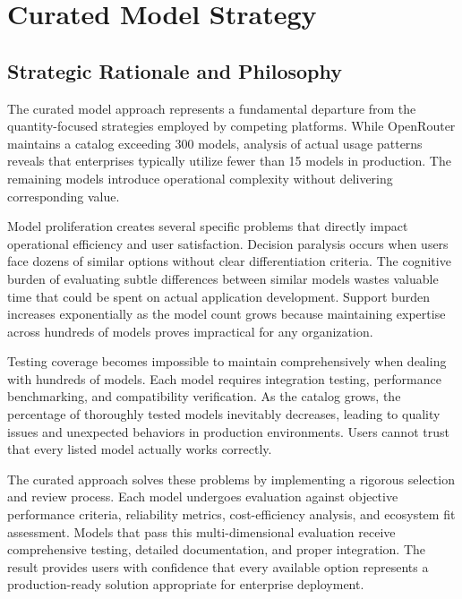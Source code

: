 \documentclass[12pt,a4paper,twoside]{report}
\begin{document}

\chapter{Curated Model Strategy}

\section{Strategic Rationale and Philosophy}

The curated model approach represents a fundamental departure from the quantity-focused strategies employed by competing platforms. While OpenRouter maintains a catalog exceeding 300 models, analysis of actual usage patterns reveals that enterprises typically utilize fewer than 15 models in production. The remaining models introduce operational complexity without delivering corresponding value.

Model proliferation creates several specific problems that directly impact operational efficiency and user satisfaction. Decision paralysis occurs when users face dozens of similar options without clear differentiation criteria. The cognitive burden of evaluating subtle differences between similar models wastes valuable time that could be spent on actual application development. Support burden increases exponentially as the model count grows because maintaining expertise across hundreds of models proves impractical for any organization.

Testing coverage becomes impossible to maintain comprehensively when dealing with hundreds of models. Each model requires integration testing, performance benchmarking, and compatibility verification. As the catalog grows, the percentage of thoroughly tested models inevitably decreases, leading to quality issues and unexpected behaviors in production environments. Users cannot trust that every listed model actually works correctly.

The curated approach solves these problems by implementing a rigorous selection and review process. Each model undergoes evaluation against objective performance criteria, reliability metrics, cost-efficiency analysis, and ecosystem fit assessment. Models that pass this multi-dimensional evaluation receive comprehensive testing, detailed documentation, and proper integration. The result provides users with confidence that every available option represents a production-ready solution appropriate for enterprise deployment.
\end{document}
